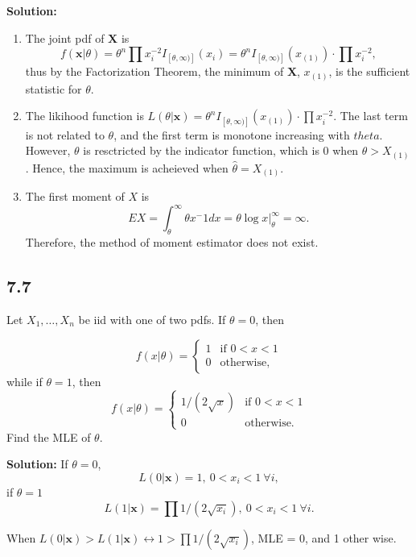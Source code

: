 \documentclass[11pt]{article}
\newcommand{\X}{\mathbf{X}}
\newcommand{\x}{\mathbf{x}}
\newcommand{\Sol}{\par {\bf Solution:}}
\newcommand{\sample}[1]{#1_1 , \dots , #1_n}
\begin{document}
\Sol
\begin{enumerate}[label=(\alph*)]
    \item
    The joint pdf of $\X$ is
    \[
    f(\x|\theta) = \theta^n \prod x_i^{-2} I_{[\theta, \infty)]}(x_i) = \theta^n I_{[\theta, \infty)]}(x_{(1)}) \cdot \prod x_i^{-2},
    \]
    thus by the Factorization Theorem, the minimum of $\X$, $x_{(1)}$, is the sufficient statistic for $\theta$.
    \item
    The likihood function is
    $L(\theta|\x) = \theta^n I_{[\theta, \infty)]}(x_{(1)}) \cdot \prod x_i^{-2}$.
    The last term is not related to $\theta$, and the first term is monotone increasing with $theta$. However, $\theta$ is resctricted by the indicator function, which is 0 when $\theta > X_{(1)}$. Hence, the maximum is acheieved when $\hat \theta = X_{(1)}$.
    
    \item
    The first moment of $X$ is
    \[
    E X = \int_\theta^\infty \theta x^-1 dx = \theta \log x |_\theta^\infty = \infty.
    \]
    Therefore, the method of moment estimator does not exist.
\end{enumerate}

\subsection*{7.7}
Let $\sample{X}$ be iid with one of two pdfs. If $\theta = 0$, then 

\begin{equation*}
    f(x|\theta) = \begin{cases}
        1 & \textrm{if } 0 < x < 1 \\
        0 & \textrm{otherwise,}
    \end{cases}
\end{equation*}
while if $\theta = 1$, then
\begin{equation*}
    f(x|\theta) = \begin{cases}
        1/(2\sqrt{x}) & \textrm{if } 0 < x < 1 \\
        0 & \textrm{otherwise.}
    \end{cases}
\end{equation*}
Find the MLE of $\theta$.

\Sol
If $\theta = 0$,
\[
L(0|\x) = 1, ~0 < x_i < 1 ~\forall i,
\]
if $\theta = 1$
\[
L(1|\x) = \prod 1/(2\sqrt{x_i}), ~0 < x_i < 1 ~\forall i.
\]

When $L(0|\x) > L(1|\x) \longleftrightarrow 1 > \prod 1/(2\sqrt{x_i})$, MLE = 0, and 1 other wise.
\end{document}
